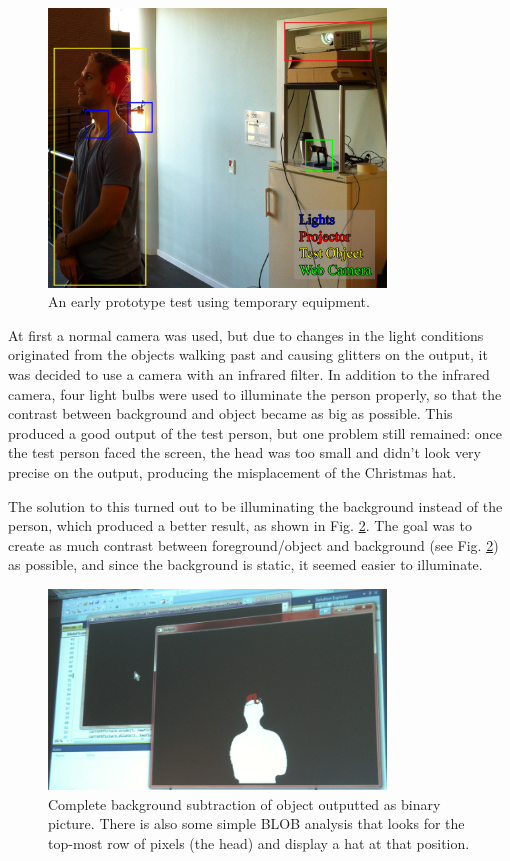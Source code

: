 \begin{figure}[htbp]
\centering
\includegraphics[width=0.80\textwidth]{Pictures/Test/TestSetup.jpg}
\caption{An early prototype test using temporary equipment.}
\label{fig:ir_cam_test}
\end{figure} 

At first a normal camera was used, but due to changes in the light conditions originated from the objects walking past and causing glitters on the output, it was decided to use a camera with an infrared filter. In addition to the infrared camera, four light bulbs were used to illuminate the person properly, so that the contrast between background and object became as big as possible. This produced a good output of the test person, but one problem still remained: once the test person faced the screen, the head was too small and didn't look very precise on the output, producing the misplacement of the Christmas hat.

The solution to this turned out to be illuminating the background instead of the person, which produced a better result, as shown in Fig. \ref{fig:max_subtracted}. The goal was to create as much contrast between foreground/object and background (see Fig. \ref{fig:max_subtracted}) as possible, and since the background is static, it seemed easier to illuminate.

\begin{figure}[htbp]
\centering
\includegraphics[width=0.80\textwidth]{Pictures/Test/MaxSubtracted.jpg}
\caption{Complete background subtraction of object outputted as binary picture. There is also some simple BLOB analysis that looks for the top-most row of pixels (the head) and display a hat at that position.}
\label{fig:max_subtracted}
\end{figure}

